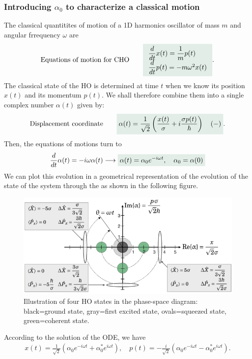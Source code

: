 \subsubsection{Introducing $\alpha_0$ to characterize a classical motion}
The classical quantitites of motion of a 1D harmonics oscillator of mass $m$ and angular frrequency $\omega$ are 
\begin{align}
    \text{Equations of motion for CHO}\qquad\highlight{\begin{array}{l}
        \dfrac{d}{dt}x(t)=\dfrac{1}{m}p(t)\\
        \dfrac{d}{dt}p(t)=-m\omega^2x(t)
    \end{array}}.
\end{align}
The classical state of the HO is determined at time $t$ when we know its position $x(t)$ and its momentum $p(t)$.
We shall therefore combine them into a single complex number $\alpha(t)$ given by:
\begin{align}
    \text{Displacement coordinate}\qquad\highlight{\alpha(t)=\frac{1}{\sqrt{2}}\left(\frac{x(t)}{\sigma}+i\frac{\sigma p(t)}{\hbar}\right)\quad(-)}.
\end{align}
Then, the equations of motions turn to 
\begin{align}
    \frac{d}{dt}\alpha(t)=-i\omega\alpha(t)\longrightarrow\highlight{\alpha(t)=\alpha_0e^{-i\omega t},\quad \alpha_0=\alpha(0)}
    \label{eq:timeevolaclassic}
\end{align}
We can plot this evolution in a geometrical representation of the evolution of the state of the system through the  
as shown in the following figure.
\begin{figure}[h!]
    \centering
    \includegraphics[width=.7\columnwidth]{PartOne/ChapterThree/phasespacediagram.png}
    \caption{Illustration of four HO states in the phase-space diagram: black=ground state, gray=first excited state, 
    ovals=squeezed state, green=coherent state.}
\end{figure}
According to the solution of the ODE, we have 
\begin{align}
    x(t)=\frac{1}{\sqrt{2}}(\alpha_0e^{-i\omega t}+\alpha_0^*e^{i\omega t}),\quad p(t)=-\frac{i}{\sqrt{2}}(\alpha_0e^{-i\omega t}-\alpha_0^*e^{i\omega t}).
\end{align}
